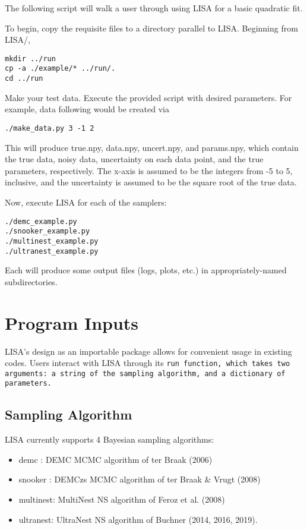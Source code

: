 \documentclass[letterpaper, 12pt]{article}
\begin{document}
The following script will walk a user through using LISA for a basic quadratic 
fit.

\noindent To begin, copy the requisite files to a directory parallel to LISA. 
Beginning from LISA/, 
\begin{verbatim}
mkdir ../run
cp -a ./example/* ../run/.
cd ../run
\end{verbatim}

\noindent Make your test data.  Execute the provided script with 
desired parameters.  For example, data following  
would be created via
\begin{verbatim}
./make_data.py 3 -1 2
\end{verbatim}
\noindent This will produce true.npy, data.npy, uncert.npy, and params.npy, 
which contain the true data, noisy data, uncertainty on each data point, and 
the true parameters, respectively.  The x-axis is assumed to be the integers 
from -5 to 5, inclusive, and the uncertainty is assumed to be the square root 
of the true data.

\noindent Now, execute LISA for each of the samplers:

\begin{verbatim}
./demc_example.py
./snooker_example.py
./multinest_example.py
./ultranest_example.py
\end{verbatim}

\noindent Each will produce some output files (logs, plots, etc.) in appropriately-named 
subdirectories.


\section{Program Inputs}
\label{sec:inputs}

LISA's design as an importable package allows for convenient usage in existing 
codes.  Users interact with LISA through its \tt{run} function, which takes two 
arguments: a string of the sampling algorithm, and a dictionary of parameters.

\subsection{Sampling Algorithm}

LISA currently supports 4 Bayesian sampling algorithms:
\begin{itemize}
\item demc   : DEMC MCMC algorithm of ter Braak (2006)
\item snooker  : DEMCzs MCMC algorithm of ter Braak \& Vrugt (2008)
\item multinest: MultiNest NS algorithm of Feroz et al. (2008)
\item ultranest: UltraNest NS algorithm of Buchner (2014, 2016, 2019).
\end{itemize}
\end{document}
